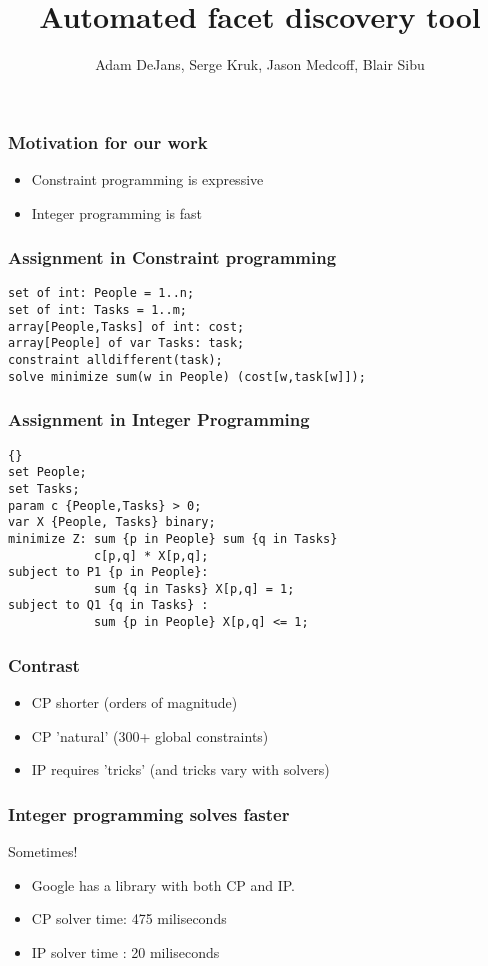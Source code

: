 \documentclass{beamer}
\author[Serge Kruk] { Adam DeJans, Serge Kruk, Jason Medcoff, Blair Sibu}
\title{Automated facet discovery tool}
\institute{Oakland University}
\begin{document}
\begin{frame}
  \titlepage
\end{frame}
\lstset{language=Python,label=bin_packing}
\begin{frame}
  \frametitle{Motivation for our work}
  \begin{itemize}
    \item Constraint programming is expressive
    \item Integer programming is fast
  \end{itemize}
\end{frame}

\begin{frame}[fragile]
  \frametitle{Assignment in Constraint programming}
  \begin{lstlisting}
set of int: People = 1..n;
set of int: Tasks = 1..m;
array[People,Tasks] of int: cost;
array[People] of var Tasks: task;
constraint alldifferent(task);
solve minimize sum(w in People) (cost[w,task[w]]);
  \end{lstlisting}
\end{frame}

\begin{frame}[fragile]
  \frametitle{Assignment in Integer Programming}
\begin{lstlisting}{}
set People;
set Tasks;
param c {People,Tasks} > 0;
var X {People, Tasks} binary;
minimize Z: sum {p in People} sum {q in Tasks} 
            c[p,q] * X[p,q];
subject to P1 {p in People}: 
            sum {q in Tasks} X[p,q] = 1;
subject to Q1 {q in Tasks} : 
            sum {p in People} X[p,q] <= 1;
\end{lstlisting}
\end{frame}

\begin{frame}
  \frametitle{Contrast}
  \begin{itemize}
  \item<1-> CP shorter (orders of magnitude)
  \item<2-> CP 'natural' (300+ global constraints)
  \item<3-> IP requires 'tricks' (and tricks vary with solvers)
  \end{itemize}
\end{frame}

\begin{frame}
  \frametitle{Integer programming solves faster}
  \begin{center}
    Sometimes!
  \end{center}
  
  \begin{itemize}
  \item<1-> Google has a library with both CP and IP.
  \item<2-> CP solver time: 475 miliseconds
  \item<3-> IP solver time : 20 miliseconds
  \end{itemize}
\end{frame}
\end{document}

